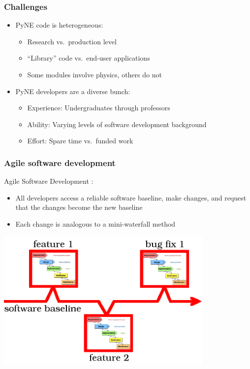 \documentclass[12pt]{beamer}
\begin{document}
\begin{frame}[fragile]
\frametitle{Challenges}

\begin{itemize}
\item{PyNE code is heterogeneous:}
    \begin{itemize}
    \item{Research vs.\ production level}
    \item{``Library'' code vs.\ end-user applications}
    \item{Some modules involve physics, others do not}
    \end{itemize}
\item{PyNE developers are a diverse bunch}:
   \begin{itemize}
   \item{Experience: Undergraduates through professors}
   \item{Ability: Varying levels of software development background}
   \item{Effort: Spare time vs.\ funded work}
   \end{itemize}
\end{itemize}

\end{frame}
\begin{frame}
\frametitle{Agile software development}

Agile Software Development \cite{larman2004agile}:
\begin{itemize}
\item{All developers access a reliable software baseline, make changes, and request that the changes become the new baseline}
\item{Each change is analogous to a mini-waterfall method}
\end{itemize}

\centerline{\includegraphics[width=0.8\textwidth]{figures/agile.png}}

\end{frame}
\end{document}
